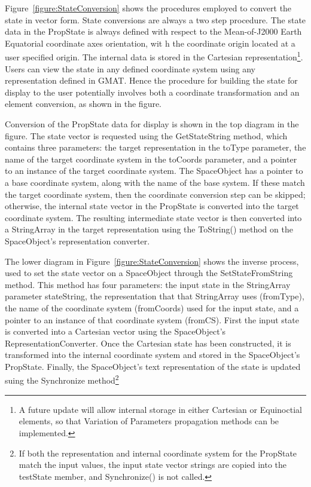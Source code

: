 Figure~\ref{figure:StateConversion} shows the procedures employed to convert the state in vector
form.  State conversions are always a two step procedure.  The state data in the PropState is
always defined with respect to the Mean-of-J2000 Earth Equatorial coordinate axes orientation, wit
h the coordinate origin located at a user specified origin. The internal data is stored in the
Cartesian representation\footnote{A future update will allow internal storage in either Cartesian
or Equinoctial elements, so that Variation of Parameters propagation methods can be implemented.}.
Users can view the state in any defined coordinate system using any representation defined in GMAT.
 Hence the procedure for building the state for display to the user potentially involves both a
coordinate transformation and an element conversion, as shown in the figure.

Conversion of the PropState data for display is shown in the top diagram in the figure.  The state
vector is requested using the GetStateString method, which contains three parameters: the target
representation in the toType parameter, the name of the target coordinate system in the toCoords
parameter, and a pointer to an instance of the target coordinate system.  The SpaceObject has a
pointer to a base coordinate system, along with the name of the base system.  If these match the
target coordinate system, then the coordinate conversion step can be skipped; otherwise, the
internal state vector in the PropState is converted into the target coordinate system.  The
resulting intermediate state vector is then converted into a StringArray in the target
representation using the ToString() method on the SpaceObject's representation converter.

The lower diagram in Figure~\ref{figure:StateConversion} shows the inverse process, used to set the
state vector on a SpaceObject through the SetStateFromString method.  This method has four
parameters: the input state in the StringArray parameter stateString, the representation that that
StringArray uses (fromType), the name of the coordinate system (fromCoords) used for the input
state, and a pointer to an instance of that coordinate system (fromCS).  First the input state is
converted into a Cartesian vector using the SpaceObject's RepresentationConverter.  Once the
Cartesian state has been constructed, it is transformed into the internal coordinate system and
stored in the SpaceObject's PropState.  Finally, the SpaceObject's text representation of the state
is updated suing the Synchronize method\footnote{If both the representation and internal coordinate
system for the PropState match the input values, the input state vector strings are copied into the
testState member, and Synchronize() is not called.}

